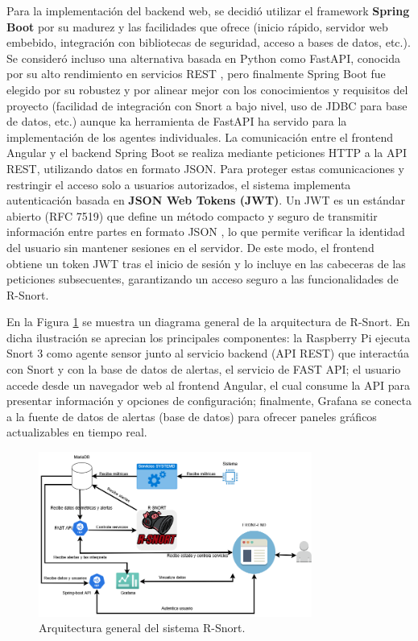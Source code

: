 \documentclass[11pt,a4paper,twoside]{report}
\begin{document}
Para la implementación del backend web, se decidió utilizar el framework \textbf{Spring Boot} por su madurez y las facilidades que ofrece (inicio rápido, servidor web embebido, integración con bibliotecas de seguridad, acceso a bases de datos, etc.). Se consideró incluso una alternativa basada en Python como FastAPI, conocida por su alto rendimiento en servicios REST \cite{FastAPI}, pero finalmente Spring Boot fue elegido por su robustez y por alinear mejor con los conocimientos y requisitos del proyecto (facilidad de integración con Snort a bajo nivel, uso de JDBC para base de datos, etc.) aunque ka herramienta de FastAPI ha servido para la implementación de los agentes individuales. La comunicación entre el frontend Angular y el backend Spring Boot se realiza mediante peticiones HTTP a la API REST, utilizando datos en formato JSON. Para proteger estas comunicaciones y restringir el acceso solo a usuarios autorizados, el sistema implementa autenticación basada en \textbf{JSON Web Tokens (JWT)}. Un JWT es un estándar abierto (RFC 7519) que define un método compacto y seguro de transmitir información entre partes en formato JSON \cite{JWT}, lo que permite verificar la identidad del usuario sin mantener sesiones en el servidor. De este modo, el frontend obtiene un token JWT tras el inicio de sesión y lo incluye en las cabeceras de las peticiones subsecuentes, garantizando un acceso seguro a las funcionalidades de R-Snort.\newline

En la Figura \ref{fig:arquitectura-general} se muestra un diagrama general de la arquitectura de R-Snort. En dicha ilustración se aprecian los principales componentes: la Raspberry Pi ejecuta Snort 3 como agente sensor junto al servicio backend (API REST) que interactúa con Snort y con la base de datos de alertas, el servicio de FAST API; el usuario accede desde un navegador web al frontend Angular, el cual consume la API para presentar información y opciones de configuración; finalmente, Grafana se conecta a la fuente de datos de alertas (base de datos) para ofrecer paneles gráficos actualizables en tiempo real.\newline

\begin{figure}[hbtp]
	\centering
	 \includegraphics[width=0.8\textwidth]{documento/5.png}
	\caption{Arquitectura general del sistema R-Snort.}
	\label{fig:arquitectura-general}
\end{figure}
\end{document}
